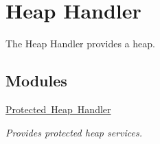 \hypertarget{group__RTEMSScoreHeap}{}\section{Heap Handler}
\label{group__RTEMSScoreHeap}


The Heap Handler provides a heap.  


\subsection*{Modules}
\begin{DoxyCompactItemize}
\item 
\mbox{\hyperlink{group__RTEMSScoreProtHeap}{Protected Heap Handler}}
\begin{DoxyCompactList}\small\item\em Provides protected heap services. \end{DoxyCompactList}\end{DoxyCompactItemize}
